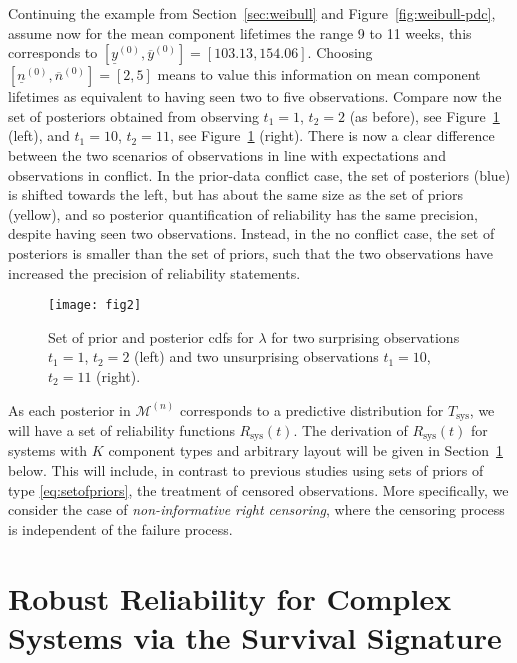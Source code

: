 \documentclass[Journal,letterpaper]{ascelike-new}
\newcommand{\uz}{^{(0)}} %
\newcommand{\un}{^{(n)}} %
\newcommand{\ul}[1]{\underline{#1}}
\newcommand{\ol}[1]{\overline{#1}}
\newcommand{\Rsys}{R_\text{sys}}
\def\Rsys{R_\text{sys}}
\def\Tsys{T_\text{sys}}
\def\yzl{\ul{y}\uz}
\def\yzu{\ol{y}\uz}
\def\nzl{\ul{n}\uz}
\def\nzu{\ol{n}\uz}
\def\MN{\mathcal{M}\un}
\begin{document}
Continuing the example from Section~\ref{sec:weibull} and Figure~\ref{fig:weibull-pdc},
assume now for the mean component lifetimes the range 9 to 11 weeks,
this corresponds to $[\yzl,\yzu] = [103.13, 154.06]$.
Choosing $[\nzl,\nzu] =[2, 5]$
means to value this information on mean component lifetimes as equivalent to having seen two to five observations.
Compare now the set of posteriors obtained from observing
$t_1 = 1$, $t_2 = 2$ (as before), see Figure~\ref{fig:setofpost-pdc-nopdc} (left),
and $t_1 = 10$, $t_2 = 11$, see Figure~\ref{fig:setofpost-pdc-nopdc} (right).
There is now a clear difference between the two scenarios of
observations in line with expectations and observations in conflict.
In the prior-data conflict case, the set of posteriors (blue)
is shifted towards the left, but has about the same size as the set of priors (yellow),
and so posterior quantification of reliability has the same precision,
despite having seen two observations.
Instead, in the no conflict case, the set of posteriors is smaller than the set of priors,
such that the two observations have increased the precision of reliability statements.

\begin{figure}
\texttt{[image: fig2]}
\caption{Set of prior and posterior cdfs for $\lambda$ for two surprising observations $t_1 = 1$, $t_2 = 2$ (left)
and two unsurprising observations $t_1 = 10$, $t_2 = 11$ (right).}
\label{fig:setofpost-pdc-nopdc}
\end{figure}

As each posterior in $\MN$ corresponds to a predictive distribution for $\Tsys$,
we will have a set of reliability functions $\Rsys(t)$.
The derivation of $\Rsys(t)$ for systems with $K$ component types and arbitrary layout
will be given in Section~\ref{sec:robrel} below.
This will include, in contrast to previous studies using sets of priors of type 
\eqref{eq:setofpriors}, the treatment of censored observations.
More specifically, we consider the case of \emph{non-informative right censoring},
where the censoring process is independent of the failure process.

\newpage
\section{Robust Reliability for Complex Systems via the Survival Signature}
\label{sec:robrel}
\end{document}
